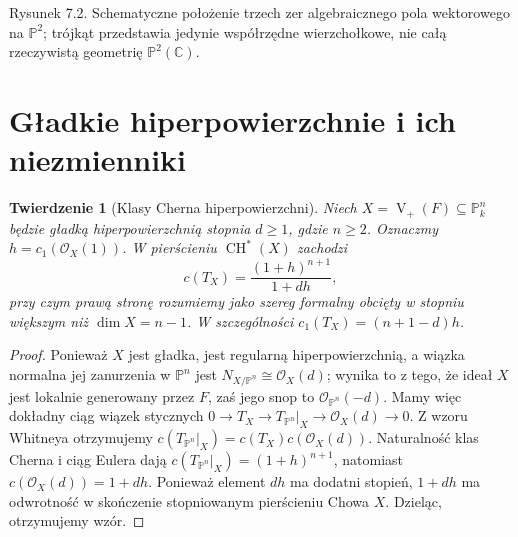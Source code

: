 \documentclass[11pt,a4paper,openany]{report}
\numberwithin{equation}{section}
\theoremstyle{plain}
\newtheorem{twierdzenie}{Twierdzenie}[section]
\theoremstyle{definition}
\theoremstyle{remark}
\newcommand{\C}{\mathbb C}
\newcommand{\PP}{\mathbb P}
\newcommand{\V}{\operatorname V}
\begin{document}
\begin{center}
\begin{minipage}{\linewidth}
\centering
{}

{\small Rysunek 7.2. Schematyczne położenie trzech zer algebraicznego pola wektorowego na $\PP^2$; trójkąt przedstawia jedynie współrzędne wierzchołkowe, nie całą rzeczywistą geometrię $\PP^2(\C)$.}
\end{minipage}
\end{center}

\section{Gładkie hiperpowierzchnie i ich niezmienniki}
\label{sec:ga7-hypersurfaces}

\begin{twierdzenie}[Klasy Cherna hiperpowierzchni]
\label{tw:ga7-hypersurface-chern}
Niech $X=\V_+(F)\subseteq\PP^n_k$ będzie gładką
hiperpowierzchnią stopnia $d\ge1$, gdzie $n\ge2$.
Oznaczmy $h=c_1(\mathcal O_X(1))$.
W pierścieniu $\operatorname{CH}^*(X)$ zachodzi
\[
 c(T_X)=\frac{(1+h)^{n+1}}{1+dh},
\]
przy czym prawą stronę rozumiemy jako szereg formalny
obcięty w stopniu większym niż $\dim X=n-1$.
W szczególności $c_1(T_X)=(n+1-d)h$.
\end{twierdzenie}
\begin{proof}
Ponieważ $X$ jest gładka, jest regularną hiperpowierzchnią,
a wiązka normalna jej zanurzenia w $\PP^n$ jest
$N_{X/\PP^n}\cong\mathcal O_X(d)$; wynika to
z tego, że ideał $X$ jest lokalnie generowany przez $F$,
zaś jego snop to $\mathcal O_{\PP^n}(-d)$.
Mamy więc dokładny ciąg wiązek stycznych
$0\to T_X\to T_{\PP^n}|_X\to\mathcal O_X(d)\to0$.
Z wzoru Whitneya otrzymujemy
$c(T_{\PP^n}|_X)=c(T_X)c(\mathcal O_X(d))$.
Naturalność klas Cherna i ciąg Eulera dają
$c(T_{\PP^n}|_X)=(1+h)^{n+1}$, natomiast
$c(\mathcal O_X(d))=1+dh$.
Ponieważ element $dh$ ma dodatni stopień, $1+dh$
ma odwrotność w skończenie stopniowanym pierścieniu
Chowa $X$. Dzieląc, otrzymujemy wzór.
\end{proof}
\end{document}

